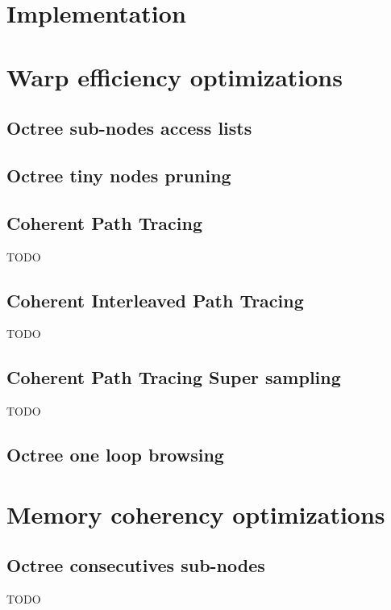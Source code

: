 \documentclass[10pt,twocolumn,a4paper]{article}
\begin{document}
\section{Implementation}


\section{Warp efficiency optimizations}

\subsection{Octree sub-nodes access lists}


\subsection{Octree tiny nodes pruning}


\subsection{Coherent Path Tracing}
TODO

\subsection{Coherent Interleaved Path Tracing}
TODO

\subsection{Coherent Path Tracing Super sampling}
TODO

\subsection{Octree one loop browsing}



\section{Memory coherency optimizations}

\subsection{Octree consecutives sub-nodes}
TODO
\end{document}
